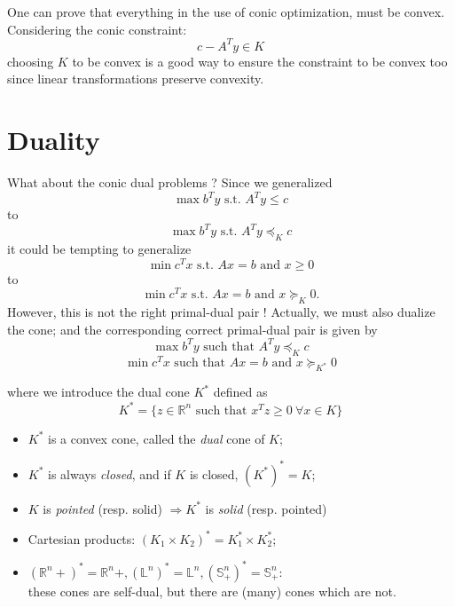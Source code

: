 One can prove that everything in the use of conic optimization, must be convex. Considering the conic constraint: 
\begin{equation}
c-A^Ty \in K \nonumber 
\end{equation}
choosing $K$ to be convex is a good way to ensure the constraint to be convex too since linear transformations preserve convexity. \\

\section{Duality}
What about the conic dual problems ? Since we generalized
\[ \max b^T y \text{ s.t. } A^T y \leq c \] to
\[ \max b^T y \text{ s.t. } A^T y \preceq_K c \] it could be tempting to generalize
\[ \min c^T x \text{ s.t. } Ax = b \text{ and } x \geq 0 \]
to
\[ \min c^T x \text{ s.t. } Ax = b \text{ and } x \succeq_K 0 .\]
However, this is not the right primal-dual pair ! Actually, we must also dualize the cone; and the corresponding correct primal-dual pair is given by 
\vspace{0.3cm} \[ \max b^T y \text{ such that } A^T y \preceq_K c \]
\[ \min c^T x \text{ such that } Ax = b \text{ and } x \succeq_{K^*} 0 \]

\vspace{0.3cm}
where we introduce the dual cone $K^*$ defined as 
\[ K^* = \{ z \in \mathbb{R}^n \text{ such that }
x^T z \geq 0 \ \forall x \in K \} \]

\begin{itemize}
\item $K^*$ is a convex cone, called the \emph{dual} cone of $K$;
\item $K^*$ is always \emph{closed}, and if $K$ is closed, $(K^*)^* = K$; \item $K$ is \emph{pointed} (resp. 
   solid) $\Rightarrow K^*$ is \emph{solid} (resp. pointed) \item Cartesian products: $(K_1 \times K_2)^*
   = K_1^* \times K_2^*$;
\item $(\mathbb{R}^n+)^* = \mathbb{R}^n+, (\mathbb{L}^n)^* = \mathbb{L}^n, (\mathbb{S}_+^n)^* = \mathbb{S}_+^n$: \\these cones are self-dual, but there are (many) cones which are not.
\end{itemize}


% 
